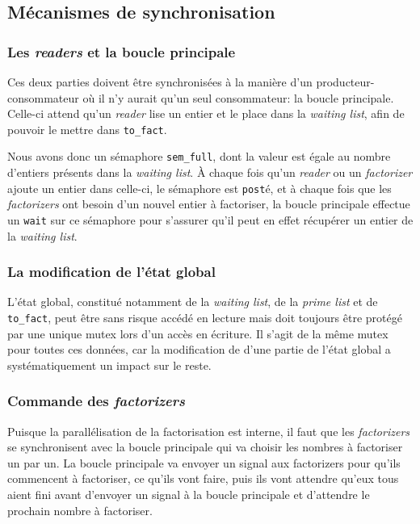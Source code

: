 \documentclass[a4paper,10pt]{article}
\begin{document}
\subsection*{Mécanismes de synchronisation}

\subsubsection*{Les \emph{readers} et la boucle principale}

Ces deux parties doivent être synchronisées à la manière d'un producteur-consommateur où il n'y aurait qu'un seul consommateur: la boucle principale. Celle-ci attend qu'un \emph{reader} lise un entier et le place dans la \emph{waiting list}, afin de pouvoir le mettre dans \texttt{to\_fact}.

Nous avons donc un sémaphore \texttt{sem\_full}, dont la valeur est égale au nombre d'entiers présents dans la \emph{waiting list}. À chaque fois qu'un \emph{reader} ou un \emph{factorizer} ajoute un entier dans celle-ci, le sémaphore est \texttt{post}é, et à chaque fois que les \emph{factorizers} ont besoin d'un nouvel entier à factoriser, la boucle principale effectue un \texttt{wait} sur ce sémaphore pour s'assurer qu'il peut en effet récupérer un entier de la \emph{waiting list}.

\subsubsection*{La modification de l'état global}

L'état global, constitué notamment de la \emph{waiting list}, de la \emph{prime list} et de \texttt{to\_fact}, peut être sans risque accédé en lecture mais doit toujours être protégé par une unique mutex lors d'un accès en écriture. Il s'agit de la même mutex pour toutes ces données, car la modification de d'une partie de l'état global a systématiquement un impact sur le reste. 
\subsubsection*{Commande des \emph{factorizers}}

Puisque la parallélisation de la factorisation est interne, il faut que les \emph{factorizers} se synchronisent avec la boucle principale qui va choisir les nombres à factoriser un par un. La boucle principale va envoyer un signal aux factorizers pour qu'ils commencent à factoriser, ce qu'ils vont faire, puis ils vont attendre qu'eux tous aient fini avant d'envoyer un signal à la boucle principale et d'attendre le prochain nombre à factoriser.
\end{document}
